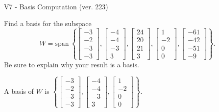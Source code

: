 \begin{exercise}
  \begin{exerciseTitle}V7 - Basis Computation (ver. 223)\end{exerciseTitle}
  \begin{exerciseStatement}
    Find a basis for the subspace 
\[W=\mathrm{span}\ \left\{\left[\begin{array}{r}
-3 \\
-2 \\
-3 \\
-3
\end{array}\right] , \left[\begin{array}{r}
-4 \\
-4 \\
-3 \\
3
\end{array}\right] , \left[\begin{array}{r}
24 \\
20 \\
21 \\
3
\end{array}\right] , \left[\begin{array}{r}
1 \\
-2 \\
0 \\
0
\end{array}\right] , \left[\begin{array}{r}
-61 \\
-42 \\
-51 \\
-9
\end{array}\right]\right\}.\]
 Be sure to explain why your result is a basis.


  \end{exerciseStatement}
  \begin{exerciseAnswer}
   A basis of \(W\) is  \(\left\{\left[\begin{array}{r}
-3 \\
-2 \\
-3 \\
-3
\end{array}\right] , \left[\begin{array}{r}
-4 \\
-4 \\
-3 \\
3
\end{array}\right] , \left[\begin{array}{r}
1 \\
-2 \\
0 \\
0
\end{array}\right]\right\}\).
  


  \end{exerciseAnswer}
\end{exercise}